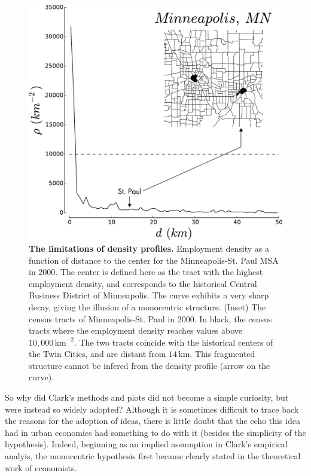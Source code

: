 \begin{figure}
    \centering
    \includegraphics[width=\textwidth]{./gfx/chapter-monocentric/distance_center_minneapolis.pdf}
    \caption{{\bf The limitations of density profiles.} Employment density as a function of distance to the center for the
    Minneapolis-St. Paul MSA in $2000$. The center is defined here as the
    tract with the highest employment density, and corresponds to the historical
    Central Business District of Minneapolis. The curve exhibits a very sharp
    decay, giving the illusion of a monocentric structure. (Inset) The census tracts
    of Minneapolis-St. Paul in 2000. In black, the census tracts where the
    employment density reaches values above $10,000\,\text{km}^{-2}$. The two tracts
    coincide with the historical centers of the Twin Cities, and are distant from
    $14\,\text{km}$. This fragmented structure cannot be infered from the density
    profile (arrow on the curve).
    \label{fig:distance_center_minneapolis}}
\end{figure}


So why did Clark's methods and plots did not become a simple curiosity, but were
instead so widely adopted? Although it is sometimes difficult to trace back the
reasons for the adoption of ideas, there is little doubt that the echo this idea
had in urban economics had something to do with it (besides the simplicity of
the hypothesis). Indeed, beginning as an implied assumption in Clark's empirical
analyis, the monocentric hypothesis first became clearly stated in the
theoretical work of economists.


